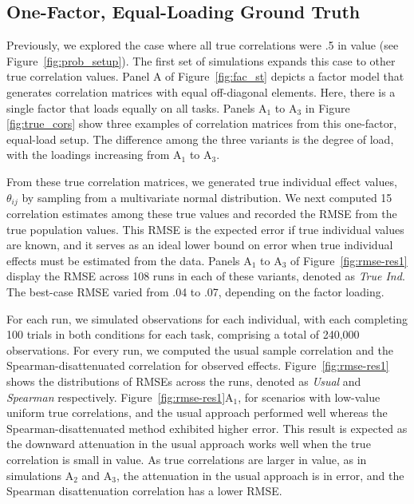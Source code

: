 \documentclass[man, 12pt]{apa7} %
\begin{document}
\subsection{One-Factor, Equal-Loading Ground Truth}

Previously, we explored the case where all true correlations were .5 in value (see Figure~\ref{fig:prob_setup}).  The first set of simulations expands this case to other true correlation values.  Panel A of Figure~\ref{fig:fac_st} depicts a factor model that generates correlation matrices with equal off-diagonal elements.  Here, there is a single factor that loads equally on all tasks.  Panels A$_1$ to A$_3$ in Figure~ \ref{fig:true_cors} show three examples of correlation matrices from this one-factor, equal-load setup.  The difference among the three variants is the degree of load, with the loadings increasing from A$_1$ to A$_3$.

From these true correlation matrices, we generated true individual effect values, $\theta_{ij}$ by sampling from a multivariate normal distribution.  We next computed 15 correlation estimates among these true values and recorded the RMSE from the true population values. This RMSE is the expected error if true individual values are known, and it serves as an ideal lower bound on error when true individual effects must be estimated from the data. Panels A$_1$ to A$_3$ of Figure~\ref{fig:rmse-res1} display the RMSE across 108 runs in each of these variants, denoted as \textit{True Ind}. The best-case RMSE varied from .04 to .07, depending on the factor loading.

For each run, we simulated observations for each individual, with each completing 100 trials in both conditions for each task, comprising a total of 240,000 observations. For every run, we computed the usual sample correlation and the Spearman-disattenuated correlation for observed effects.  Figure~\ref{fig:rmse-res1} shows the distributions of RMSEs across the runs, denoted as \textit{Usual} and \textit{Spearman} respectively. Figure~\ref{fig:rmse-res1}A$_1$, for scenarios with low-value uniform true correlations, and the usual approach performed well whereas the Spearman-disattenuated method exhibited higher error.   This result is expected as the downward attenuation in the usual approach works well when the true correlation is small in value.  As true correlations are larger in value, as in simulations A$_2$ and A$_3$, the attenuation in the usual approach is in error, and the Spearman disattenuation correlation has a lower RMSE.
\end{document}
